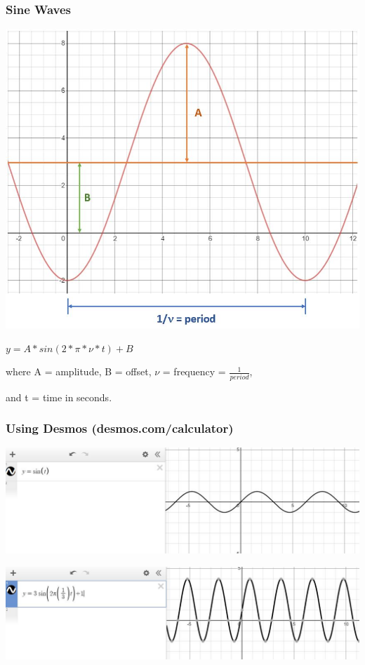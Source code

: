 \documentclass{beamer}
\begin{document}
\begin{frame}\frametitle{Sine Waves}
\begin{center}
\includegraphics[scale=0.25]{fig/sin.jpg}
\end{center}

\begin{center}
$y = A * sin(2*\pi*\nu*t) + B$
\end{center}

where A = amplitude, B = offset, $\nu$ = frequency = $\frac{1}{period}$, 

and t = time in seconds.
\end{frame}


\begin{frame}\frametitle{Using Desmos (desmos.com/calculator)}
\begin{center}
\includegraphics[scale=0.35]{fig/desmos1.jpg}
\end{center}
\begin{center}

\vspace{0.5cm}

\includegraphics[scale=0.35]{fig/desmos2.jpg}
\end{center}
\end{frame}
\end{document}

